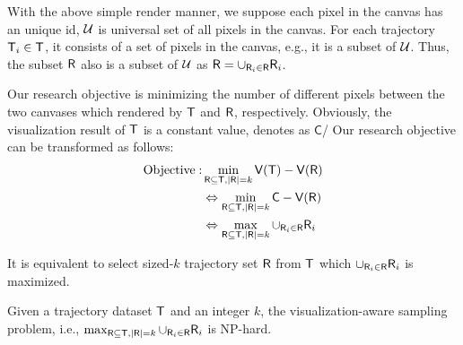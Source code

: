 With the above simple render manner,  we suppose each pixel in the canvas has an unique id, $\mathcal{U}$ is universal set of all pixels in the canvas.
For each trajectory $\mathsf{T}_i \in \mathsf{T}$, it consists of a set of pixels in the canvas, e.g., it is a subset of $\mathcal{U}$.
Thus, the subset $\mathsf{R}$ also is a subset of $\mathcal{U}$ as $\mathsf{R} = \cup_{\mathsf{R}_i \in \mathsf{R}} \mathsf{R}_i$.

Our research objective is minimizing the number of different pixels between the two canvases which rendered by $\mathsf{T}$ and $\mathsf{R}$, respectively.
Obviously, the visualization result of $\mathsf{T}$ is a constant value, denotes as $\mathsf{C}$/
Our research objective can be transformed as follows:
\begin{align}\label{eqn:obj2} \nonumber
\text{Objective}: & \min_{\mathsf{R} \subseteq \mathsf{T}, |\mathsf{R}| = k}  \mathsf{V}(\mathsf{T}) - \mathsf{V}(\mathsf{R}) \\ \nonumber
& \Leftrightarrow \min_{\mathsf{R} \subseteq \mathsf{T}, |\mathsf{R}| = k}  \mathsf{C} - \mathsf{V}(\mathsf{R}) \\ \nonumber
& \Leftrightarrow \max_{\mathsf{R} \subseteq \mathsf{T}, |\mathsf{R}| = k}  \cup_{\mathsf{R}_i \in \mathsf{R}} \mathsf{R}_i
\end{align}

It is equivalent to select sized-$k$ trajectory set $\mathsf{R}$ from $\mathsf{T}$ which $\cup_{\mathsf{R}_i \in \mathsf{R}} \mathsf{R}_i$ is maximized.

\begin{lemma}[NP hard]
Given a trajectory dataset $\mathsf{T}$ and an integer $k$, the visualization-aware sampling problem, i.e., $\max_{\mathsf{R} \subseteq \mathsf{T}, |\mathsf{R}| = k}  \cup_{\mathsf{R}_i \in \mathsf{R}} \mathsf{R}_i$ is NP-hard.
\end{lemma}

